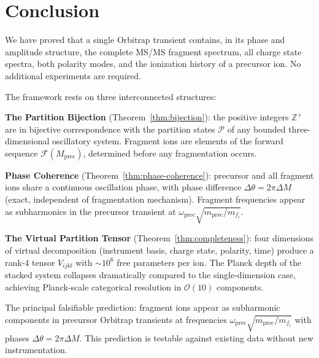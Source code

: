 \documentclass[twocolumn,10pt,a4paper]{article}
\theoremstyle{thmstyle}
\theoremstyle{definition}
\theoremstyle{remark}
\newcommand{\Zp}{\mathbb{Z}^{+}}
\newcommand{\Parts}{\mathcal{P}}
\newcommand{\calF}{\mathcal{F}}
\begin{document}
\section{Conclusion}
\label{sec:conclusion}

We have proved that a single Orbitrap transient contains, in its phase
and amplitude structure, the complete MS/MS fragment spectrum, all
charge state spectra, both polarity modes, and the ionization history
of a precursor ion. No additional experiments are required.

The framework rests on three interconnected structures:

\textbf{The Partition Bijection} (Theorem~\ref{thm:bijection}): the
positive integers $\Zp$ are in bijective correspondence with the
partition states $\Parts$ of any bounded three-dimensional oscillatory
system. Fragment ions are elements of the forward sequence
$\calF(M_{\text{prec}})$, determined before any fragmentation occurs.

\textbf{Phase Coherence} (Theorem~\ref{thm:phase-coherence}): precursor
and all fragment ions share a continuous oscillation phase, with phase
difference $\Delta\theta = 2\pi\Delta M$ (exact, independent of
fragmentation mechanism). Fragment frequencies appear as subharmonics
in the precursor transient at $\omega_{\text{prec}}\sqrt{m_{\text{prec}}/m_{f_i}}$.

\textbf{The Virtual Partition Tensor} (Theorem~\ref{thm:completeness}):
four dimensions of virtual decomposition (instrument basis, charge state,
polarity, time) produce a rank-4 tensor $V_{ijkl}$ with $\sim 10^6$
free parameters per ion. The Planck depth of the stacked system collapses
dramatically compared to the single-dimension case, achieving Planck-scale
categorical resolution in $\mathcal{O}(10)$ components.

The principal falsifiable prediction: fragment ions appear as subharmonic
components in precursor Orbitrap transients at frequencies
$\omega_{\text{prec}}\sqrt{m_{\text{prec}}/m_{f_i}}$ with phases
$\Delta\theta = 2\pi\Delta M$. This prediction is testable against
existing data without new instrumentation.



\end{document}
